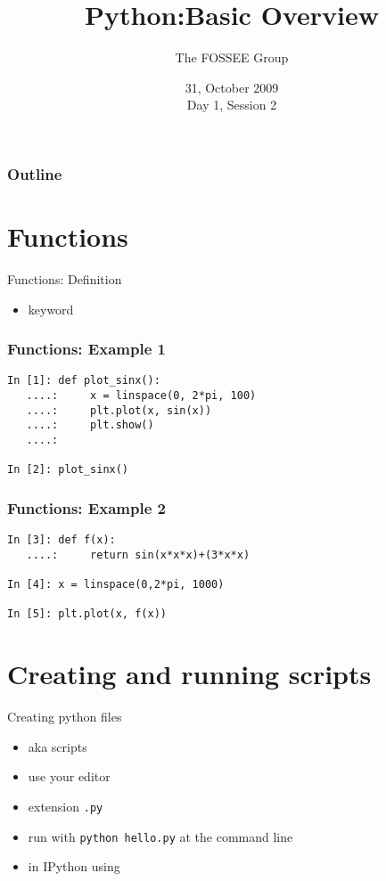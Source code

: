 \documentclass[14pt,compress]{beamer}
\title[Basic Python]{Python:Basic Overview\\}
\author[FOSEE Team] {The FOSSEE Group}
\institute[IIT Bombay] {Department of Aerospace Engineering\\IIT Bombay}
\date[] {31, October 2009\\Day 1, Session 2}
\newcounter{time}
\newcommand{\inctime}[1]{\addtocounter{time}{#1}{\tiny \thetime\ m}}
\newcommand{\typ}[1]{\texttt{#1}}
\newcommand{\kwrd}[1]{ \texttt{\textbf{\color{blue}{#1}}}  }
\begin{document}
\begin{frame}
  \titlepage
\end{frame}

\begin{frame}
  \frametitle{Outline}
  \tableofcontents
\end{frame}

\section{Functions}
\begin{frame}{Functions: Definition}
\begin{itemize}
  \item \kwrd{def} keyword
\end{itemize}
\end{frame}

\begin{frame}[fragile]
\frametitle{Functions: Example 1}
  \begin{lstlisting}
In [1]: def plot_sinx():
   ....:     x = linspace(0, 2*pi, 100)
   ....:     plt.plot(x, sin(x))
   ....:     plt.show()
   ....:    

In [2]: plot_sinx()
  \end{lstlisting}
\end{frame}

\begin{frame}[fragile]
\frametitle{Functions: Example 2}
  \begin{lstlisting}
In [3]: def f(x):
   ....:     return sin(x*x*x)+(3*x*x)

In [4]: x = linspace(0,2*pi, 1000)

In [5]: plt.plot(x, f(x))
  \end{lstlisting}
  \inctime{10}
\end{frame}


\section{Creating and running scripts}
\begin{frame}
  {Creating python files}
  \begin{itemize}
    \item aka scripts
    \item use your editor
    \item extension \typ{.py}
    \item run with \texttt{python hello.py} at the command line
    \item in IPython using \kwrd{\%run}
  \end{itemize}
\inctime{5}
\end{frame}
\end{document}
